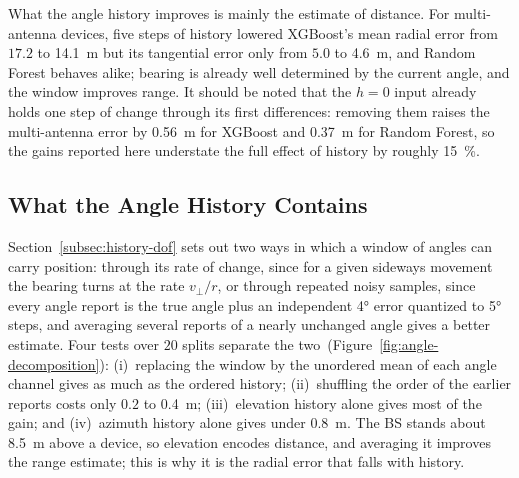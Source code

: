 What the angle history improves is mainly the estimate of distance. For multi-antenna devices, five steps of history lowered XGBoost's mean radial error from $17.2$ to \SI{14.1}{\meter} but its tangential error only from $5.0$ to \SI{4.6}{\meter}, and Random Forest behaves alike; bearing is already well determined by the current angle, and the window improves range. It should be noted that the $h=0$ input already holds one step of change through its first differences: removing them raises the multi-antenna error by \SI{0.56}{\meter} for XGBoost and \SI{0.37}{\meter} for Random Forest, so the gains reported here understate the full effect of history by roughly \SI{15}{\percent}.

\subsection{What the Angle History Contains}
\label{subsec:averaging}

Section~\ref{subsec:history-dof} sets out two ways in which a window of angles can carry position: through its rate of change, since for a given sideways movement the bearing turns at the rate $v_\perp/r$, or through repeated noisy samples, since every angle report is the true angle plus an independent \ang{4} error quantized to \ang{5} steps, and averaging several reports of a nearly unchanged angle gives a better estimate. Four tests over $20$ splits separate the two~(Figure~\ref{fig:angle-decomposition}): (i)~replacing the window by the unordered mean of each angle channel gives as much as the ordered history; (ii)~shuffling the order of the earlier reports costs only $0.2$ to \SI{0.4}{\meter}; (iii)~elevation history alone gives most of the gain; and (iv)~azimuth history alone gives under \SI{0.8}{\meter}. The BS stands about \SI{8.5}{\meter} above a device, so elevation encodes distance, and averaging it improves the range estimate; this is why it is the radial error that falls with history.

